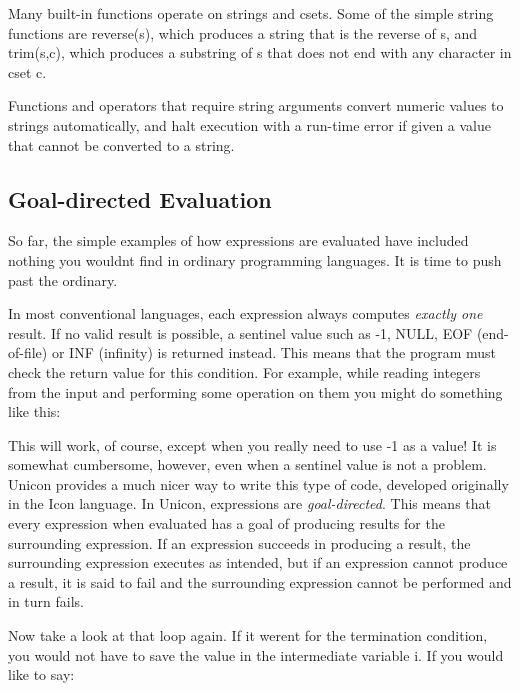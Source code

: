 Many built-in functions operate on strings and csets. Some of the simple
string functions are \textsf{reverse(s)}, which
produces a string that is the reverse of \textsf{s}, and
\textsf{trim(s,c)}, which produces a substring of
\textsf{s} that does not end with any character in cset \textsf{c}.

Functions and operators that require string arguments convert numeric
values to strings automatically, and halt execution with a run-time
error if given a value that cannot be converted to a string.

\subsection[Goal{}-directed Evaluation]{Goal-directed Evaluation}
So far, the simple examples of how
expressions are evaluated have included nothing you
wouldn{\textquotesingle}t find in ordinary programming languages. It is
time to push past the ordinary.

In most conventional languages, each expression always computes
\textit{exactly one} result. If no valid result is possible, a
sentinel value such as -1, NULL, EOF
(end-of-file) or INF (infinity) is
returned instead. This means that the program must check the return
value for this condition. For example, while reading integers from the
input and performing some operation on them you might do something like
this:


This will work, of course, except when you really need to use -1 as a
value! It is somewhat cumbersome, however, even when a sentinel value
is not a problem. Unicon provides a much nicer way to write this type
of code, developed originally in the Icon language. In Unicon,
expressions are \textit{goal-directed}. This means that every
expression when evaluated has a goal of producing results for the
surrounding expression. If an expression succeeds in producing a
result, the surrounding expression executes as intended, but if an
expression cannot produce a result, it is said to fail and the surrounding expression cannot be performed and in
turn fails.

Now take a look at that loop again. If it weren{\textquotesingle}t for
the termination condition, you would not have to save the value in the
intermediate variable \textsf{i}. If you would like to say:

